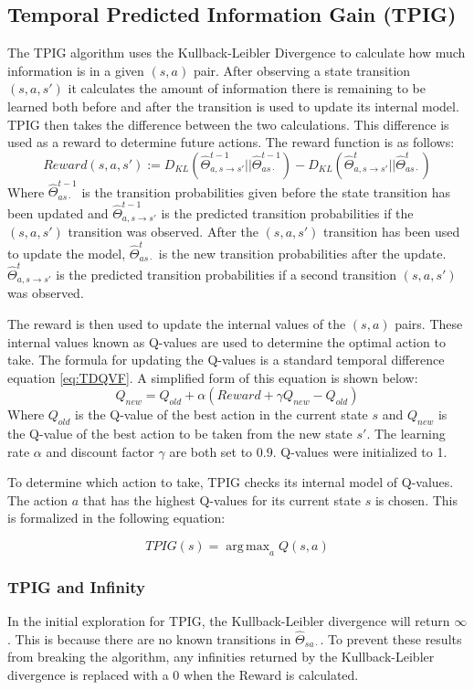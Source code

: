 \documentclass[12pt]{thesis}
\DeclareMathOperator*{\argmax}{arg\,max}
\begin{document}
\subsection{Temporal Predicted Information Gain (TPIG)}
The TPIG algorithm uses the Kullback-Leibler Divergence to calculate how much information is in a given $(s,a)$ pair. After observing a state transition $(s,a,s')$ it calculates the amount of information there is remaining to be learned both before and after the transition is used to update its internal model. TPIG then takes the difference between the two calculations. This difference is used as a reward to determine future actions. The reward function is as follows:
\begin{equation}
	Reward(s,a,s') := D_{KL}(\hat{\Theta}_{a,s \rightarrow s'}^{t-1} || \hat{\Theta}_{as\cdot}^{t-1}) - D_{KL}(\hat{\Theta}_{a,s \rightarrow s'}^{t} || \hat{\Theta}_{as\cdot}^{t})
\label{eq:TPIGReward}
\end{equation}
Where $\hat{\Theta}_{as\cdot}^{t-1}$ is the transition probabilities given before the state transition has been updated and $\hat{\Theta}_{a,s \rightarrow s'}^{t-1}$ is the predicted transition probabilities if the $(s,a,s')$ transition was observed. After the $(s,a,s')$ transition has been used to update the model, $\hat{\Theta}_{as\cdot}^{t}$ is the new transition probabilities after the update. $\hat{\Theta}_{a,s \rightarrow s'}^{t}$ is the predicted transition probabilities if a second transition $(s,a,s')$ was observed.

The reward is then used to update the internal values of the $(s,a)$ pairs. These internal values known as Q-values are used to determine the optimal action to take.
The formula for updating the Q-values is a standard temporal difference equation \eqref{eq:TDQVF}. A simplified form of this equation is shown below:
\[Q_{new} = Q_{old} + \alpha(Reward + \gamma Q_{new} - Q_{old})\]
Where $Q_{old}$ is the Q-value of the best action in the current state $s$ and $Q_{new}$ is the Q-value of the best action to be taken from the new state $s'$. The learning rate $\alpha$ and discount factor $\gamma$ are both set to $0.9$. Q-values were initialized to 1.

To determine which action to take, TPIG checks its internal model of Q-values. The action $a$ that has the highest Q-values for its current state $s$ is chosen. This is formalized in the following equation:

\[ TPIG(s) = \argmax_a  Q(s,a)\]

\subsubsection{TPIG and Infinity}
In the initial exploration for TPIG, the Kullback-Leibler divergence will return $\infty$. This is because there are no known transitions in $\hat{\Theta}_{sa\cdot}$. To prevent these results from breaking the algorithm, any infinities returned by the Kullback-Leibler divergence is replaced with a 0 when the Reward is calculated.
\end{document}
